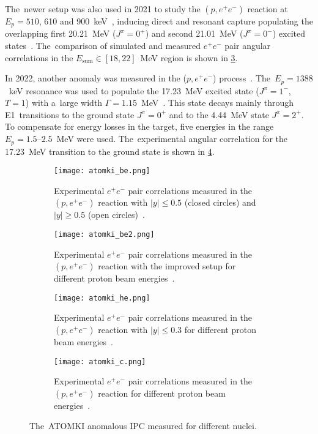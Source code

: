 			The~newer setup was also used in 2021 to study the $(p,e^+ e^-)$ reaction at $E_p = 510$, 610 and 900~keV~\cite{atomki_he2}, inducing direct and resonant capture populating the overlapping first 20.21~MeV ($J^\pi = 0^+$) and second 21.01~MeV ($J^\pi = 0^-$) excited states~\cite{resonances2}. The~comparison of simulated and measured $e^+e^-$ pair angular correlations in the ${E_\text{sum}\in[18,22]}$~MeV region is shown in \cref{fig:atomki_he}.
			
			In 2022, another anomaly was measured in the ($p,e^+e^-$) process~\cite{atomki_c}. The~$E_p = 1388$~keV resonance was used to populate the 17.23~MeV excited state ($J^\pi = 1^-$, $T = 1$) with a~large width $\Gamma = 1.15$~MeV~\cite{resonances3}. This state decays mainly through E1~transitions to the ground state $J^\pi = 0^+$ and to the 4.44~MeV state $J^\pi = 2^+$. To compensate for energy losses in the target, five energies in the range $E_p = 1.5\text{--}2.5$~MeV were used. The~experimental angular correlation for the 17.23~MeV transition to the ground state is shown in \cref{fig:atomki_c}.
			
				\begin{figure}
					\centering
					\begin{subfigure}[t]{0.48\textwidth}
						\centering
						\texttt{[image: atomki\_be.png]}
						\caption{Experimental $e^+e^-$ pair correlations measured in the $(p,e^+e^-)$ reaction with $|y| \leq 0.5$ (closed circles) and $|y| \geq 0.5$ (open circles)~\cite{atomki_be}.}
						\label{fig:atomki_be}
					\end{subfigure}
					\hfill
					\begin{subfigure}[t]{0.42\textwidth}
						\centering
						\texttt{[image: atomki\_be2.png]}
						\caption{Experimental $e^+e^-$ pair correlations measured in the $(p,e^+e^-)$ reaction with the improved setup for different proton beam energies~\cite{atomki_be2}.}
						\label{fig:atomki_be2}
					\end{subfigure}
					\begin{subfigure}[t]{0.45\textwidth}
						\centering
						\texttt{[image: atomki\_he.png]}
						\caption{Experimental $e^+e^-$ pair correlations measured in the $(p,e^+e^-)$ reaction with $|y| \leq 0.3$ for different proton beam energies~\cite{atomki_he2}.}
						\label{fig:atomki_he}
					\end{subfigure}
					\hfill
					\begin{subfigure}[t]{0.45\textwidth}
						\centering
						\texttt{[image: atomki\_c.png]}
						\caption{Experimental $e^+e^-$ pair correlations measured in the $(p,e^+e^-)$ reaction for different proton beam energies~\cite{atomki_c}.}
						\label{fig:atomki_c}
					\end{subfigure}
					\caption{The~ATOMKI anomalous \ac{IPC} measured for different nuclei.}
					\label{fig:atomki}
				\end{figure}
			
